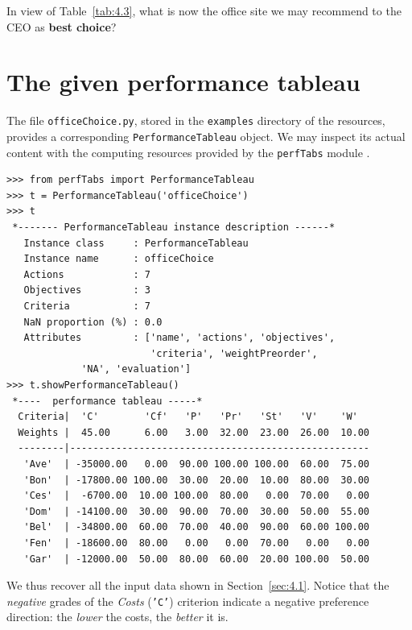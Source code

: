 In view of Table~\vref{tab:4.3}, what is now the office site we may recommend to the CEO as \textbf{best choice}?

\section{The given performance tableau}
\label{sec:4.2}


The file \texttt{officeChoice.py}, stored in the \texttt{examples} directory of the \Digraph resources, provides a corresponding \texttt{PerformanceTableau} object. We may inspect its actual content with the computing resources provided by the \texttt{perfTabs} module .
\begin{lstlisting}[caption={Inspecting the \texttt{officeChoice} performance tableau.},label=list:4.1]
>>> from perfTabs import PerformanceTableau
>>> t = PerformanceTableau('officeChoice')
>>> t
 *------- PerformanceTableau instance description ------*
   Instance class     : PerformanceTableau
   Instance name      : officeChoice
   Actions            : 7
   Objectives         : 3
   Criteria           : 7
   NaN proportion (%) : 0.0
   Attributes         : ['name', 'actions', 'objectives',
                         'criteria', 'weightPreorder',
			 'NA', 'evaluation']
>>> t.showPerformanceTableau()
 *----  performance tableau -----*
  Criteria|  'C'        'Cf'   'P'   'Pr'   'St'   'V'    'W'   
  Weights |  45.00      6.00   3.00  32.00  23.00  26.00  10.00    
  --------|----------------------------------------------------
   'Ave'  | -35000.00   0.00  90.00 100.00 100.00  60.00  75.00  
   'Bon'  | -17800.00 100.00  30.00  20.00  10.00  80.00  30.00  
   'Ces'  |  -6700.00  10.00 100.00  80.00   0.00  70.00   0.00  
   'Dom'  | -14100.00  30.00  90.00  70.00  30.00  50.00  55.00  
   'Bel'  | -34800.00  60.00  70.00  40.00  90.00  60.00 100.00  
   'Fen'  | -18600.00  80.00   0.00   0.00  70.00   0.00   0.00  
   'Gar'  | -12000.00  50.00  80.00  60.00  20.00 100.00  50.00  
\end{lstlisting}

We thus recover all the input data shown in Section~\ref{sec:4.1}. Notice that the \emph{negative} grades of the \emph{Costs} (\texttt{'C'}) criterion indicate a negative preference direction: the \emph{lower} the costs, the \emph{better} it is.

